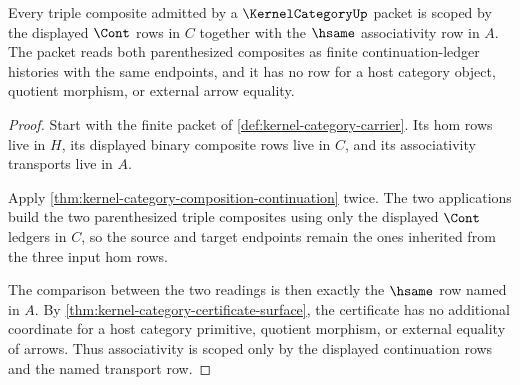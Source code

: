 \begin{theorem}
\label{thm:kernel-category-associativity-scope}
Every triple composite admitted by a $\KernelCategoryUp$ packet is scoped by the displayed $\Cont$ rows in $C$ together with the $\hsame$ associativity row in $A$. The packet reads both parenthesized composites as finite continuation-ledger histories with the same endpoints, and it has no row for a host category object, quotient morphism, or external arrow equality.
\end{theorem}
\begin{proof}
Start with the finite packet of \autoref{def:kernel-category-carrier}. Its hom rows live in $H$, its displayed binary composite rows live in $C$, and its associativity transports live in $A$.

Apply \autoref{thm:kernel-category-composition-continuation} twice. The two applications build the two parenthesized triple composites using only the displayed $\Cont$ ledgers in $C$, so the source and target endpoints remain the ones inherited from the three input hom rows.

The comparison between the two readings is then exactly the $\hsame$ row named in $A$. By \autoref{thm:kernel-category-certificate-surface}, the certificate has no additional coordinate for a host category primitive, quotient morphism, or external equality of arrows. Thus associativity is scoped only by the displayed continuation rows and the named transport row.
\end{proof}

